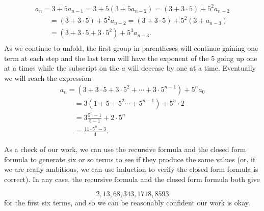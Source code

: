 \begin{Solution}{35.3}

\begin{gather*}
a_n = 3 + 5a_{n-1} = 3+ 5(3+ 5a_{n-2}) = (3 + 3\cdot5) + 5^2a_{n-2}\\
\qquad = (3 + 3\cdot5) + 5^2a_{n-2} = (3 + 3\cdot5) + 5^2(3+a_{n-3})\\
\qquad = (3+3\cdot 5 +3\cdot 5^2) + 5^3a_{n-3}.\\
\end{gather*}
As we continue to unfold, the first group in parentheses will continue gaining one term at each step and the
last term will have the exponent of the $5$ going up one at a times while the subscript on the $a$ will decease by one at a time. Eventually we will reach the expression
\begin{gather*}
a_n = (3+ 3\cdot5 +3\cdot 5^2+ \cdots+3\cdot5^{n-1}) + 5^na_0\\[3pt]
\qquad = 3(1 + 5 + 5^2\cdots+5^{n-1}) + 5^n\cdot2\\[3pt]
\qquad = 3\frac{5^n-1}{5-1} + 2\cdot5^n\\[3pt]
\qquad = \frac{11\cdot 5^n - 3}{4}.
\end{gather*}

As a check of our work, we can use the recursive formula and the closed form formula to generate six or so terms to see if they produce the same values (or, if we are really ambitious, we can use induction to verify the closed form formula is correct). In any case, the recursive formula and the closed form formula both give

\[
2, 13, 68, 343, 1718, 8593
\]
for the first six terms, and so we can be reasonably confident our work is okay.

\end{Solution}

